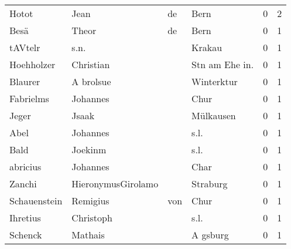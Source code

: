\begin{tabular}{llllrr}
                    Hotot &                               Jean &          de &                                        Bern &          0 &         2 \\
                     Besä &                              Theor &          de &                                        Bern &          0 &         1 \\
                  tAVtelr &                               s.n. &             &                                      Krakau &          0 &         1 \\
               Hoehholzer &                          Christian &             &                             Stn am Ehe in.  &          0 &         1 \\
                  Blaurer &                          A brolsue &             &                                  Winterktur &          0 &         1 \\
                Fabrielms &                           Johannes &             &                                        Chur &          0 &         1 \\
                    Jeger &                              Jsaak &             &                                   Mülkausen &          0 &         1 \\
                     Abel &                           Johannes &             &                                        s.l. &          0 &         1 \\
                     Bald &                            Joekinm &             &                                        s.l. &          0 &         1 \\
                 abricius &                           Johannes &             &                                        Char &          0 &         1 \\
                   Zanchi &                 HieronymusGirolamo &             &                                    Straburg &          0 &         1 \\
             Schauenstein &                           Remigius &         von &                                        Chur &          0 &         1 \\
                 Ihretius &                          Christoph &             &                                        s.l. &          0 &         1 \\
                  Schenck &                            Mathais &             &                                    A gsburg &          0 &         1 \\

\end{tabular}
